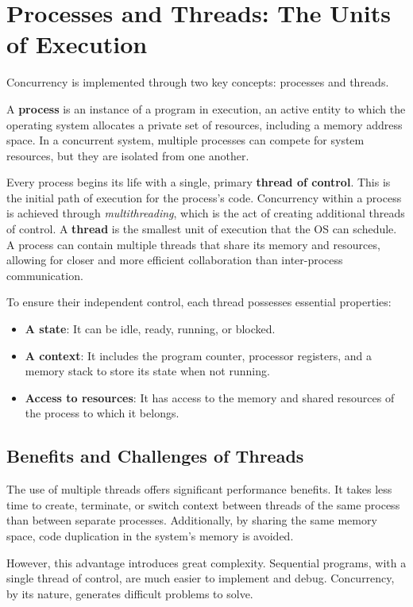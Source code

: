 \section{Processes and Threads: The Units of Execution}
Concurrency is implemented through two key concepts: processes and threads.

A \textbf{process} is an instance of a program in execution, an active entity to which the operating system allocates a private set of resources, including a memory address space. In a concurrent system, multiple processes can compete for system resources, but they are isolated from one another.

Every process begins its life with a single, primary \textbf{thread of control}. This is the initial path of execution for the process's code. Concurrency within a process is achieved through \textit{multithreading}, which is the act of creating additional threads of control. A \textbf{thread} is the smallest unit of execution that the OS can schedule. A process can contain multiple threads that share its memory and resources, allowing for closer and more efficient collaboration than inter-process communication.

To ensure their independent control, each thread possesses essential properties:
\begin{itemize}
    \item \textbf{A state}: It can be idle, ready, running, or blocked.
    \item \textbf{A context}: It includes the program counter, processor registers, and a memory stack to store its state when not running.
    \item \textbf{Access to resources}: It has access to the memory and shared resources of the process to which it belongs.
\end{itemize}

\subsection{Benefits and Challenges of Threads}
The use of multiple threads offers significant performance benefits. It takes less time to create, terminate, or switch context between threads of the same process than between separate processes. Additionally, by sharing the same memory space, code duplication in the system's memory is avoided.

However, this advantage introduces great complexity. Sequential programs, with a single thread of control, are much easier to implement and debug. Concurrency, by its nature, generates difficult problems to solve.

